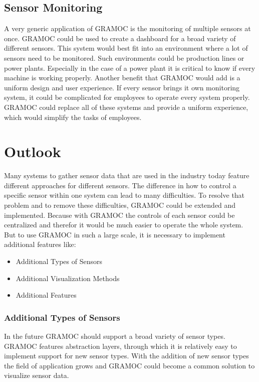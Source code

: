 \subsection{Sensor Monitoring}
A very generic application of GRAMOC is the monitoring of multiple sensors at once. GRAMOC could be used to create a dashboard for a broad variety of different sensors. This system would best fit into an environment where a lot of sensors need to be monitored. Such environments could be production lines or power plants. Especially in the case of a power plant it is critical to know if every machine is working properly. Another benefit that GRAMOC would add is a uniform design and user experience. If every sensor brings it own monitoring system, it could be complicated for employees to operate every system properly. GRAMOC could replace all of these systems and provide a uniform experience, which would simplify the tasks of employees.

\section{Outlook}
Many systems to gather sensor data that are used in the industry today feature different approaches for different sensors. The difference in how to control a specific sensor within one system can lead to many difficulties. To resolve that problem and to remove these difficulties, GRAMOC could be extended and implemented. Because with GRAMOC the controls of each sensor could be centralized and therefor it would be much easier to operate the whole system. But to use GRAMOC in such a large scale, it is necessary to implement additional features like:

\begin{itemize}
    \item Additional Types of Sensors
    \item Additional Visualization Methods
    \item Additional Features
\end{itemize}

\subsubsection{Additional Types of Sensors}
In the future GRAMOC should support a broad variety of sensor types. GRAMOC features abstraction layers, through which it is relatively easy to implement support for new sensor types. With the addition of new sensor types the field of application grows and GRAMOC could become a common solution to visualize sensor data.

